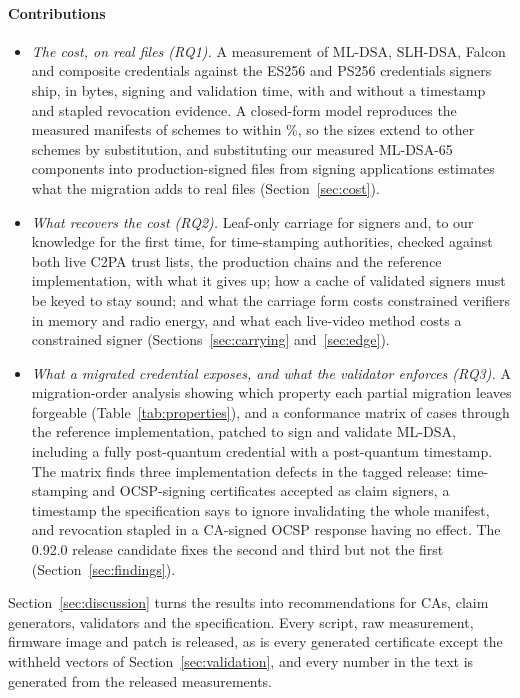 \paragraph{Contributions}
\begin{itemize}
\item \emph{The cost, on real files (RQ1).} A measurement of ML-DSA, SLH-DSA,
Falcon and composite credentials against the ES256 and PS256 credentials
signers ship, in bytes, signing and validation time, with and without a
timestamp and stapled revocation evidence. A closed-form model reproduces the
measured manifests of \NmodelN{} schemes to within \NmodelErrMax\%, so the
sizes extend to other schemes by substitution, and substituting our measured
ML-DSA-65 components into \NcpqFiles{} production-signed files from
\NcorpProdGens{} signing applications estimates what the migration adds to
real files (Section~\ref{sec:cost}).
\item \emph{What recovers the cost (RQ2).} Leaf-only carriage for signers and,
to our knowledge for the first time, for time-stamping authorities, checked
against both live C2PA trust lists, the production chains and the reference
implementation, with what it gives up; how a cache of validated signers must
be keyed to stay sound; and what the carriage form costs constrained
verifiers in memory and radio energy, and what each live-video method costs a
constrained signer (Sections~\ref{sec:carrying} and~\ref{sec:edge}).
\item \emph{What a migrated credential exposes, and what the validator
enforces (RQ3).} A migration-order analysis showing which property each
partial migration leaves forgeable (Table~\ref{tab:properties}), and a
conformance matrix of \Nvalcases{} cases through the reference implementation,
patched to sign and validate ML-DSA, including a fully post-quantum credential
with a post-quantum timestamp. The matrix finds three implementation defects in the tagged release:
time-stamping and OCSP-signing certificates accepted as claim signers, a
timestamp the specification says to ignore invalidating the whole manifest,
and revocation stapled in a CA-signed OCSP response having no effect. The
0.92.0 release candidate fixes the second and third but not the first
(Section~\ref{sec:findings}).
\end{itemize}
Section~\ref{sec:discussion} turns the results into recommendations for CAs,
claim generators, validators and the specification. Every script, raw
measurement, firmware image and patch is released, as is every generated
certificate except the withheld vectors of Section~\ref{sec:validation}, and
every number in the text is generated from the released measurements.
